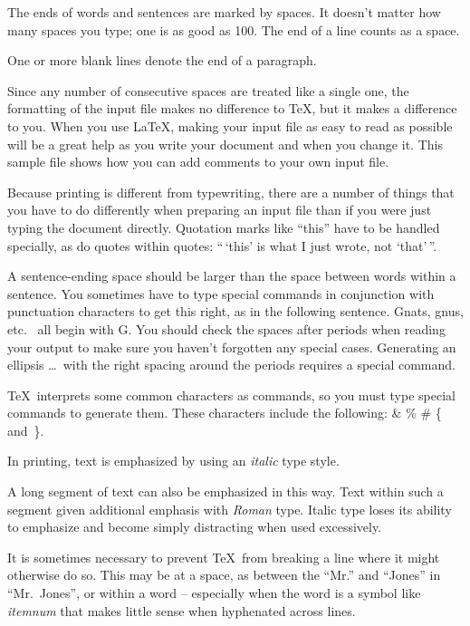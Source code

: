\documentclass[pamq,keywordsasfootnote]{ipart}
\begin{document}
The ends  of words and sentences are marked
  by   spaces. It  doesn't matter how many
spaces    you type; one is as good as 100.  The
end of   a line counts as a space.

One   or more   blank lines denote the  end
of  a paragraph.

Since any number of consecutive spaces are treated like a single
one, the formatting of the input file makes no difference to
      \TeX,
but it makes a difference to you.
When you use
      \LaTeX,
making your input file as easy to read as possible
will be a great help as you write your document and when you
change it.  This sample file shows how you can add comments to
your own input file.

Because printing is different from typewriting, there are a
number of things that you have to do differently when preparing
an input file than if you were just typing the document directly.
Quotation marks like       ``this''
have to be handled specially, as do quotes within quotes:
       ``\,`this'
    is what I just
    wrote, not  `that'\,''.


A sentence-ending space should be larger than the space between words
within a sentence.  You sometimes have to type special commands in
conjunction with punctuation characters to get this right, as in the
following sentence.
       Gnats, gnus, etc.\    %
       all begin with G\@.   %
You should check the spaces after periods when reading your output to
make sure you haven't forgotten any special cases.
Generating an ellipsis
       \ldots\
with the right spacing around the periods
requires a special  command.

\TeX\ interprets some common characters as commands, so you must type
special commands to generate them.  These characters include the
following:
       \& \% \# \{ and~\}.

In printing, text is emphasized by using an        {\em italic\/} type style.

\begin{em}
   A long segment of text can also be emphasized in this way.  Text within
   such a segment given additional emphasis
      with\/ {\em Roman}
   type.  Italic type loses its ability to emphasize and become simply
   distracting when used excessively.
\end{em}

It is sometimes necessary to prevent \TeX\ from breaking a line where
it might otherwise do so.  This may be at a space, as between the
``Mr.'' and ``Jones'' in        ``Mr.~Jones'',
or within a word -- especially when the word is a symbol like
       \mbox{\em itemnum\/}
that makes little sense when hyphenated across
       lines.
\end{document}
